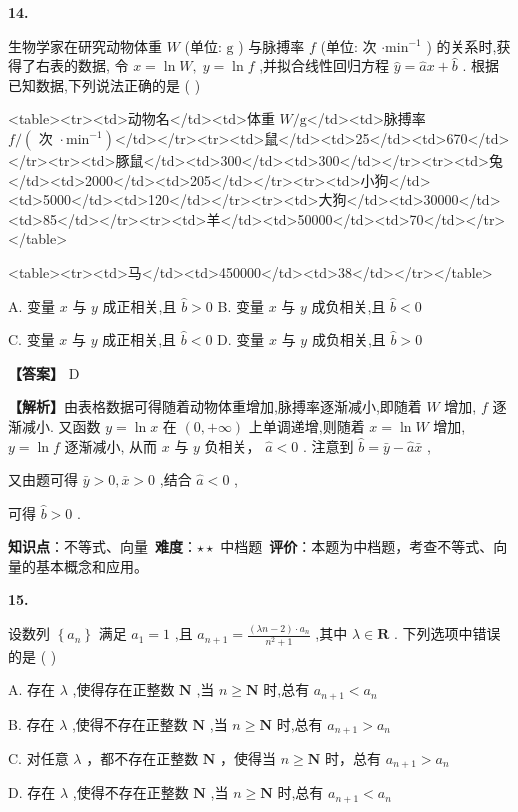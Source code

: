 \documentclass[10pt]{article}
\newenvironment{questionblock}[1]{%
  \needspace{3\baselineskip}%
  \noindent\textbf{#1.}%
}{%
  \par\vspace{1em}%
}
\begin{document}
\begin{questionblock}{14}
生物学家在研究动物体重 \(W\) (单位: \(\mathrm{g}\) ) 与脉搏率 \(f\) (单位: 次 \(\cdot  {\mathrm{{min}}}^{-1}\) ) 的关系时,获得了右表的数据, 令 \(x = \ln W,\;y = \ln f\) ,并拟合线性回归方程 \(\widehat{y} = \widehat{a}x + \widehat{b}\) . 根据已知数据,下列说法正确的是 ( )

<table><tr><td>动物名</td><td>体重 \(W/\mathrm{g}\)</td><td>脉搏率 \(f/\left( {\text{ 次 } \cdot  {\mathrm{{min}}}^{-1}}\right)\)</td></tr><tr><td>鼠</td><td>25</td><td>670</td></tr><tr><td>豚鼠</td><td>300</td><td>300</td></tr><tr><td>兔</td><td>2000</td><td>205</td></tr><tr><td>小狗</td><td>5000</td><td>120</td></tr><tr><td>大狗</td><td>30000</td><td>85</td></tr><tr><td>羊</td><td>50000</td><td>70</td></tr></table>

<table><tr><td>马</td><td>450000</td><td>38</td></tr></table>

A. 变量 \(x\) 与 \(y\) 成正相关,且 \(\widehat{b} > 0\) B. 变量 \(x\) 与 \(y\) 成负相关,且 \(\widehat{b} < 0\)

C. 变量 \(x\) 与 \(y\) 成正相关,且 \(\widehat{b} < 0\) D. 变量 \(x\) 与 \(y\) 成负相关,且 \(\widehat{b} > 0\)
\end{questionblock}

\textbf{【答案】} D

\textbf{【解析】}由表格数据可得随着动物体重增加,脉搏率逐渐减小,即随着 \(W\) 增加, \(f\) 逐渐减小. 又函数 \(y = \ln x\) 在 \(\left( {0, + \infty }\right)\) 上单调递增,则随着 \(x = \ln W\) 增加, \(y = \ln f\) 逐渐减小, 从而 \(x\) 与 \(y\) 负相关， \(\widehat{a} < 0\) . 注意到 \(\widehat{b} = \bar{y} - \widehat{a}\bar{x}\) ,

又由题可得 \(\bar{y} > 0,\bar{x} > 0\) ,结合 \(\widehat{a} < 0\) ,

可得 \(\widehat{b} > 0\) .

\begin{analysisbox}[考点分析]
\textbf{知识点}：不等式、向量\
\textbf{难度}：$\star\star$ 中档题\
\textbf{评价}：本题为中档题，考查不等式、向量的基本概念和应用。
\end{analysisbox}

\begin{questionblock}{15}
设数列 \(\left\{  {a}_{n}\right\}\) 满足 \({a}_{1} = 1\) ,且 \({a}_{n + 1} = \frac{\left( {{\lambda n} - 2}\right)  \cdot  {a}_{n}}{{n}^{2} + 1}\) ,其中 \(\lambda  \in  \mathbf{R}\) . 下列选项中错误的是 ( )

A. 存在 \(\lambda\) ,使得存在正整数 \(\mathbf{N}\) ,当 \(n \geq  \mathbf{N}\) 时,总有 \({a}_{n + 1} < {a}_{n}\)

B. 存在 \(\lambda\) ,使得不存在正整数 \(\mathbf{N}\) ,当 \(n \geq  \mathbf{N}\) 时,总有 \({a}_{n + 1} > {a}_{n}\)

C. 对任意 \(\lambda\) ，都不存在正整数 \(\mathbf{N}\) ，使得当 \(n \geq  \mathbf{N}\) 时，总有 \({a}_{n + 1} > {a}_{n}\)

D. 存在 \(\lambda\) ,使得不存在正整数 \(\mathbf{N}\) ,当 \(n \geq  \mathbf{N}\) 时,总有 \({a}_{n + 1} < {a}_{n}\)
\end{questionblock}
\end{document}
